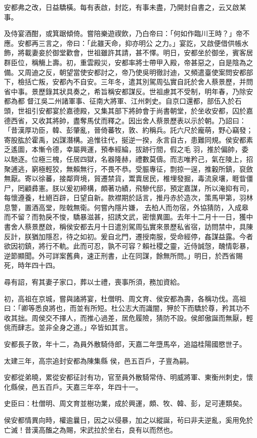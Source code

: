 \begin{pinyinscope}
 安都弗之改，日益驕橫。每有表啟，封訖，有事未盡，乃開封自書之，云又啟某事。



 及侍宴酒酣，或箕踞傾倚。嘗陪樂遊禊飲，乃白帝曰：「何如作臨川王時？」帝不應。安都再三言之，帝曰：「此雖天命，抑亦明公
 之力。」宴訖，又啟便借供帳水飾，將載妻妾於御堂歡會，世祖雖許其請，甚不懌。明日，安都坐於御坐，賓客居群臣位，稱觴上壽。初，重雲殿災，安都率將士帶甲入殿，帝甚惡之，自是陰為之備。又周迪之反，朝望當使安都討之，帝乃使吳明徹討迪，又頻遣臺使案問安都部下，檢括亡叛，安都內不自安。三年冬，遣其別駕周弘實自託於舍人蔡景歷，并問省中事。景歷錄其狀具奏之，希旨稱安都謀反。世祖慮其不受制，明年春，乃除安都為都
 督江吳二州諸軍事、征南大將軍、江州刺史。自京口還都，部伍入於石頭，世祖引安都宴於嘉德殿，又集其部下將帥會于尚書朝堂，於坐收安都，囚於嘉德西省，又收其將帥，盡奪馬仗而釋之。因出舍人蔡景歷表以示於朝。乃詔曰：「昔漢厚功臣，韓、彭肇亂，晉倚蕃牧，敦、約稱兵。託六尺於龐萌，野心竊發；寄股肱於霍禹，凶謀潛構。追惟往代，挻逆一揆，永言自古，患難同規。侯安都素乏遙圖，本慚令德，幸屬興運，預奉經綸，拔跡行間，假之毛
 羽，推於偏帥，委以馳逐。位極三槐，任居四獄，名器隆赫，禮數莫儔。而志唯矜己，氣在陵上，招聚逋逃，窮極輕狡，無賴無行，不畏不恭。受脤專征，剽掠一逞，推轂所鎮，裒斂無厭。寄以徐蕃，接鄰齊境，貿遷禁貨，鬻賣居民，椎埋發掘，毒流泉壤，睚眥僵尸，罔顧彞憲。朕以爰初締構，頗著功績，飛驂代邸，預定嘉謀，所以淹抑有司，每懷遵養，杜絕百辟，日望自新。款襟期於話言，推丹赤於造次，策馬甲第，羽林息警，置酒高堂，陛戟無衛。何嘗內隱片嫌，
 去柏人而勿宿，外協猜防，入成皋而不留？而勃戾不悛，驕暴滋甚，招誘文武，密懷異圖。去年十二月十一日，獲中書舍人蔡景歷啟，稱侯安都去月十日遣別駕周弘實來景歷私省宿，訪問禁中，具陳反計，朕猶加隱忍，待之如初。爰自北門，遷授南服，受命經停，姦謀益露。今者欲因初鎮，將行不軌。此而可忍，孰不可容？賴社稷之靈，近侍誠愨，醜情彰暴，逆節顯聞。外可詳案舊典，速正刑書，止在同謀，餘無所問。」明日，於西省賜死，時年四十四。



 尋有詔，宥其妻子家口，葬以士禮，喪事所須，務加資給。



 初，高祖在京城，嘗與諸將宴，杜僧明、周文育、侯安都為壽，各稱功伐。高祖曰：「卿等悉良將也，而並有所短。杜公志大而識闇，狎於下而驕於尊，矜其功不收其拙。周侯交不擇人，而推心過差，居危履險，猜防不設。侯郎傲誕而無厭，輕佻而肆志。並非全身之道。」卒皆如其言。



 安都長子敦，年十二，為員外散騎侍郎，天嘉二年墮馬卒，追謚桂陽國愍世子。



 太建三年，高宗追封安都為陳集縣
 侯，邑五百戶，子亶為嗣。



 安都從弟曉，累從安都征討有功，官至員外散騎常侍、明威將軍、東衡州刺史，懷化縣侯，邑五百戶。天嘉三年卒，年四十一。



 史臣曰：杜僧明、周文育並樹功業，成於興運，頗、牧、韓、彭，足可連類矣。



 侯安都情異向時，權逾曩日，因之以侵暴，加之以縱誕，茍曰非夫逆亂，奚用免於亡滅！昔漢高醢之為賜，宋武拉於坐右，良有以而然也。



\end{pinyinscope}